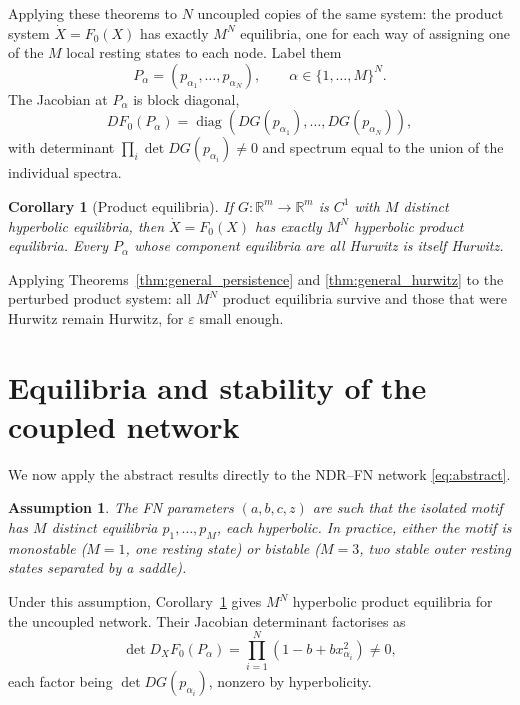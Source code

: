 \documentclass[11pt]{article}
\newtheorem{corollary}{Corollary}
\newtheorem{assumption}{Assumption}
\begin{document}
Applying these theorems to $N$ uncoupled copies of the same system: the
product system $\dot X = F_0(X)$ has exactly $M^N$ equilibria, one for
each way of assigning one of the $M$ local resting states to each node.
Label them
\begin{equation}
  P_\alpha = (p_{\alpha_1},\ldots,p_{\alpha_N}),
  \qquad \alpha \in \{1,\ldots,M\}^N.
\end{equation}
The Jacobian at $P_\alpha$ is block diagonal,
\begin{equation}
  DF_0(P_\alpha) = \operatorname{diag}(DG(p_{\alpha_1}),\ldots,DG(p_{\alpha_N})),
\end{equation}
with determinant $\prod_i\det DG(p_{\alpha_i})\neq 0$ and spectrum equal
to the union of the individual spectra.

\begin{corollary}[Product equilibria]
  \label{cor:product}
  If $G:\mathbb{R}^m\to\mathbb{R}^m$ is $C^1$ with $M$ distinct
  hyperbolic equilibria, then $\dot X = F_0(X)$ has exactly $M^N$
  hyperbolic product equilibria. Every $P_\alpha$ whose component
  equilibria are all Hurwitz is itself Hurwitz.
\end{corollary}

Applying Theorems~\ref{thm:general_persistence} and
\ref{thm:general_hurwitz} to the perturbed product system: all $M^N$
product equilibria survive and those that were Hurwitz remain Hurwitz,
for $\varepsilon$ small enough.


\section{Equilibria and stability of the coupled network}
\label{sec:main}


We now apply the abstract results directly to the NDR--FN network
\eqref{eq:abstract}.

\begin{assumption}
  \label{ass:hyp}
  The FN parameters $(a,b,c,z)$ are such that the isolated motif has
  $M$ distinct equilibria $p_1,\ldots,p_M$, each hyperbolic. In
  practice, either the motif is monostable ($M=1$, one resting state)
  or bistable ($M=3$, two stable outer resting states separated by a
  saddle).
\end{assumption}

Under this assumption, Corollary~\ref{cor:product} gives $M^N$
hyperbolic product equilibria for the uncoupled network. Their Jacobian
determinant factorises as
\begin{equation}
  \det D_X F_0(P_\alpha)
  =
  \prod_{i=1}^{N}(1 - b + bx_{\alpha_i}^2) \neq 0,
  \label{eq:block_det}
\end{equation}
each factor being $\det DG(p_{\alpha_i})$, nonzero by hyperbolicity.
\end{document}

